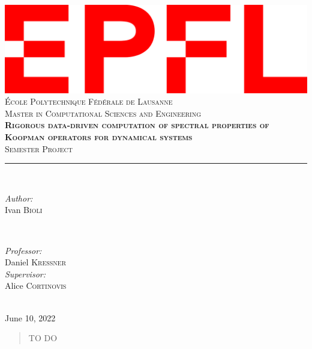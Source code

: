 \documentclass[10pt, a4paper]{report}
\begin{document}
\begin{titlepage}
	\centering
    \includegraphics[width=0.4\linewidth]{epfl.png}\\[0.5cm] 	%
    \textsc{\LARGE École Polytechnique Fédérale de Lausanne}\\
    [0.7 cm]
    \textsc{\LARGE Master in Computational Sciences and Engineering}\\
    \vspace{\fill}
    \Huge\textbf{\textsc{Rigorous data-driven computation of spectral properties of Koopman operators for dynamical systems}}\\ \vspace{\fill}		
	\textsc{\LARGE Semester Project}\\[0.4cm]
	\rule{\linewidth}{0.2 mm} \\[0.5 cm]
	\begin{minipage}{0.4\textwidth}
    \begin{flushleft} \large
    \emph{Author:}\\
    Ivan \textsc{Bioli} %
    \end{flushleft}
    \end{minipage}
    ~
    \begin{minipage}{0.4\textwidth}
    \begin{flushright} \large
    \emph{Professor:} \\
    Daniel \textsc{Kressner} \\
    \emph{Supervisor:} \\
    Alice \textsc{Cortinovis} \\
    \end{flushright}
    \end{minipage}\\
	[2cm] \Large{June 10, 2022}
	
\end{titlepage}
\restoregeometry

\begin{abstract}
\thispagestyle{empty}
TO DO
\end{abstract}

\clearpage
\thispagestyle{empty}
\tableofcontents

\setcounter{page}{1}
\end{document}
